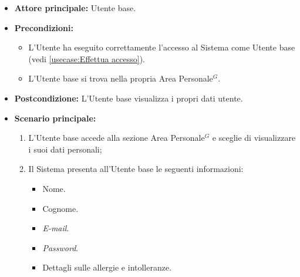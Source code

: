 \label{usecase:Visualizzazione dati utente}
\begin{itemize}
	\item \textbf{Attore principale:} Utente base.

	\item \textbf{Precondizioni:}
	      \begin{itemize}
		      \item L'Utente ha eseguito correttamente l'accesso al Sistema come
		            Utente base (vedi \autoref{usecase:Effettua accesso}).
		      \item L'Utente base si trova nella propria Area Personale$^G$.
	      \end{itemize}

	\item \textbf{Postcondizione:} L'Utente base visualizza i propri dati utente.

	\item \textbf{Scenario principale:}
	      \begin{enumerate}
		      \item L'Utente base accede alla sezione Area Personale$^G$ e sceglie di visualizzare i suoi dati personali;
		      \item Il Sistema presenta all'Utente base le seguenti informazioni:
		            \begin{itemize}
			            \item Nome.
			            \item Cognome.
			            \item \textit{E-mail}.
			            \item \textit{Password}.
			            \item Dettagli sulle allergie e intolleranze.
		            \end{itemize}
	      \end{enumerate}
\end{itemize}
